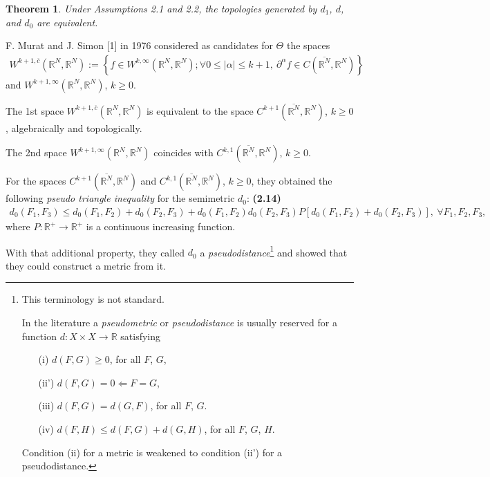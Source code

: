\documentclass{book}
\numberwithin{equation}{section}
\newtheorem{theorem}{Theorem}[section]
\begin{document}
\begin{enumerate}
    \begin{theorem}
        Under Assumptions 2.1 and 2.2, the topologies generated by $d_1$, $d$, and $d_0$ are equivalent.
    \end{theorem}
    F. Murat and J. Simon [1] in 1976 considered as candidates for $\Theta$ the spaces
    \begin{align*}
        W^{k+1,\overline{c}}(\mathbb{R}^N,\mathbb{R}^N) := \left\{f\in W^{k,\infty}(\mathbb{R}^N,\mathbb{R}^N);\forall 0\le|\alpha|\le k + 1,\ \partial^{\alpha} f\in C(\overline{\mathbb{R}^N},\mathbb{R}^N)\right\}
    \end{align*}
    and $W^{k+1,\infty}(\mathbb{R}^N,\mathbb{R}^N)$, $k\ge 0$.
    
    The 1st space $W^{k+1,\overline{c}}(\mathbb{R}^N,\mathbb{R}^N)$ is equivalent to the space $C^{k+1}(\overline{\mathbb{R}^N},\mathbb{R}^N)$, $k\ge 0$, algebraically and topologically.
    
    The 2nd space $W^{k+1,\infty}(\mathbb{R}^N,\mathbb{R}^N)$ coincides with $C^{k,1}(\overline{\mathbb{R}^N},\mathbb{R}^N)$, $k\ge 0$.
    
    For the spaces $C^{k+1}(\overline{\mathbb{R}^N},\mathbb{R}^N)$ and $C^{k,1}(\overline{\mathbb{R}^N},\mathbb{R}^N)$, $k\ge 0$, they obtained the following \textit{pseudo triangle inequality} for the semimetric $d_0$: \textbf{(2.14)}
    \begin{align*}
        d_0(F_1,F_3)\le d_0(F_1,F_2) + d_0(F_2,F_3) + d_0(F_1,F_2)d_0(F_2,F_3)P\left[d_0(F_1,F_2) + d_0(F_2,F_3)\right],\ \forall F_1,F_2,F_3,
    \end{align*}
    where $P:\mathbb{R}^+\to\mathbb{R}^+$ is a continuous increasing function.
    
    With that additional property, they called $d_0$ a \textit{pseudodistance}\footnote{This terminology is not standard.
        
        In the literature a \textit{pseudometric} or \textit{pseudodistance} is usually reserved for a function $d:X\times X\to\mathbb{R}$ satisfying
        \begin{itemize}
            \item[(i)] $d(F,G)\ge 0$, for all $F$, $G$,
            \item[(ii')] $d(F,G) = 0\Leftarrow F = G$,
            \item[(iii)] $d(F,G) = d(G,F)$, for all $F$, $G$.
            \item[(iv)] $d(F,H)\le d(F,G) + d(G,H)$, for all $F$, $G$, $H$.
        \end{itemize}
        Condition (ii) for a metric is weakened to condition (ii') for a pseudodistance.} and showed that they could construct a metric from it.
    

\end{enumerate}
\end{document}
